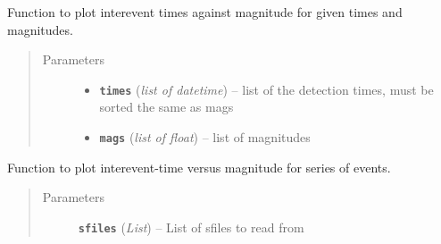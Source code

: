 \documentclass[a4paper,10pt,english]{sphinxmanual}
\begin{document}
\begin{fulllineitems}
\label{utils:EQcorrscan_plotting.interev_mag}
Function to plot interevent times against magnitude for given times
and magnitudes.
\begin{quote}\begin{description}
\item[{Parameters}] \leavevmode\begin{itemize}
\item {} 
\textbf{\texttt{times}} (\emph{list of datetime}) -- list of the detection times, must be sorted the same as mags

\item {} 
\textbf{\texttt{mags}} (\emph{list of float}) -- list of magnitudes

\end{itemize}

\end{description}\end{quote}

\end{fulllineitems}


\begin{fulllineitems}
\label{utils:EQcorrscan_plotting.interev_mag_sfiles}
Function to plot interevent-time versus magnitude for series of events.
\begin{quote}\begin{description}
\item[{Parameters}] \leavevmode
\textbf{\texttt{sfiles}} (\emph{List}) -- List of sfiles to read from

\end{description}\end{quote}

\end{fulllineitems}

\end{document}
